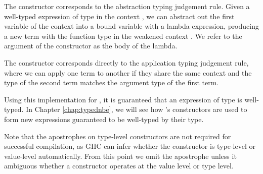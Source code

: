 The  constructor corresponds to the abstraction typing judgement rule. Given a well-typed expression of type  in the context , we can abstract out the first variable of the context into a bound variable with a lambda expression, producing a new term with the function type  in the weakened context . We refer to the argument of the  constructor as the body of the lambda.

The  constructor corresponds directly to the application typing judgement rule, where we can apply one term to another if they share the same context  and the type of the second term matches the argument type  of the first term.

Using this implementation for , it is guaranteed that an expression of type  is well-typed. In Chapter \ref{chap:typednbe}, we will see how 's constructors are used to form new expressions guaranteed to be well-typed by their type.


Note that the apostrophes on type-level constructors are not required for successful compilation, as GHC can infer whether the constructor is type-level or value-level automatically. From this point we omit the apostrophe unless it ambiguous whether a constructor operates at the value level or type level.


